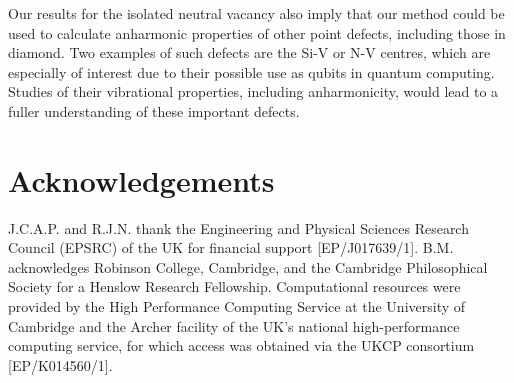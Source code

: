 \documentclass[aps,showpacs,prb,reprint,superscriptaddress,longbibliography]{revtex4-1}
\begin{document}
Our results for the isolated neutral vacancy also imply that our
method could be used to calculate anharmonic properties of other point
defects, including those in diamond. Two examples of such defects are
the Si-V or N-V centres, which are especially of interest due to their
possible use as qubits in quantum
computing.\cite{rogers_all-optical_2014,sipahigil_indistinguishable_2014,balasubramanian_ultralong_2009,bernien_heralded_2013,knowles_observing_2014,dolde_room-temperature_2013,maurer_room-temperature_2012}
Studies of their vibrational properties, including anharmonicity,
would lead to a fuller understanding of these important defects.



\section{Acknowledgements}

J.C.A.P. and R.J.N. thank the Engineering and Physical Sciences
Research Council (EPSRC) of the UK for financial support
[EP/J017639/1]. B.M.  acknowledges Robinson College, Cambridge, and
the Cambridge Philosophical Society for a Henslow Research Fellowship.
Computational resources were provided by the High Performance
Computing Service at the University of Cambridge and the Archer
facility of the UK's national high-performance computing service, for
which access was obtained via the UKCP consortium [EP/K014560/1].


\end{document}
